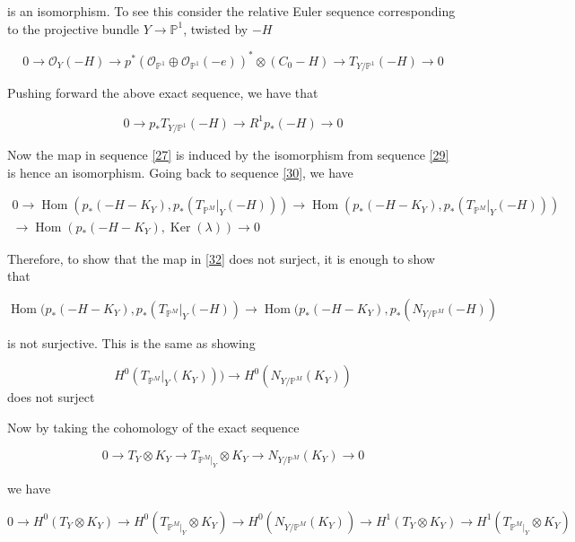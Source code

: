 \documentclass[11pt,twoside]{amsart}
\theoremstyle{plain}
\numberwithin{equation}{section}
\theoremstyle{definition}
\begin{document}
is an isomorphism. To see this consider the relative Euler sequence corresponding to the projective bundle $Y \to \mathbb{P}^1$, twisted by $-H$ 

\begin{equation}\label{28}
0 \to \mathcal{O}_Y(-H) \to p^*(\mathcal{O}_{\mathbb{P}^1} \oplus \mathcal{O}_{\mathbb{P}^1}(-e))^* \otimes (C_0-H) \to T_{Y/\mathbb{P}^1}(-H) \to 0
\end{equation}

Pushing forward the above exact sequence, we have that 

\begin{equation}\label{29}
 0 \to p_*T_{Y/\mathbb{P}^1}(-H) \to R^1p_*(-H) \to 0 
\end{equation}

Now the map in sequence \ref{27} is induced by the isomorphism from sequence \ref{29} is hence an isomorphism. Going back to sequence \ref{30}, we have 

\begin{multline}\label{31}
0 \to \operatorname{Hom}(p_*(-H-K_Y), 
 p_*(T_{\mathbb{P}^M}|_Y(-H)))  \to \operatorname{Hom}(p_*(-H-K_Y), p_*(T_{\mathbb{P}^M}|_Y(-H))) \\ \to \operatorname{Hom}(p_*(-H-K_Y),\operatorname{Ker}(\lambda)) \to 0
\end{multline}

Therefore, to show that the map in \ref{32} does not surject, it is enough to show that

\begin{equation}\label{33}
  \operatorname{Hom}(p_*(-H-K_Y), p_*(T_{\mathbb{P}^M}|_Y(-H)) \to \operatorname{Hom}(p_*(-H-K_Y), p_*(N_{Y/\mathbb{P}^M}(-H))  
\end{equation}

is not surjective. This is the same as showing 

\begin{equation}\label{34}
   H^0(T_{\mathbb{P}^M}|_Y(K_Y))) \to H^0(N_{Y/\mathbb{P}^M}(K_Y)) 
\end{equation}
does not surject

Now by taking the cohomology of the exact sequence 

$$0 \to T_Y \otimes K_Y \to T_{\mathbb{P}^M|_Y} \otimes K_Y \to N_{Y/\mathbb{P}^M}(K_Y) \to 0$$


we have 

$$0 \to H^0(T_Y \otimes K_Y) \to H^0(T_{\mathbb{P}^M|_Y} \otimes K_Y) \to H^0(N_{Y/\mathbb{P}^M}(K_Y)) \to H^1(T_Y \otimes K_Y) \to H^1(T_{\mathbb{P}^M|_Y} \otimes K_Y)$$
\end{document}
